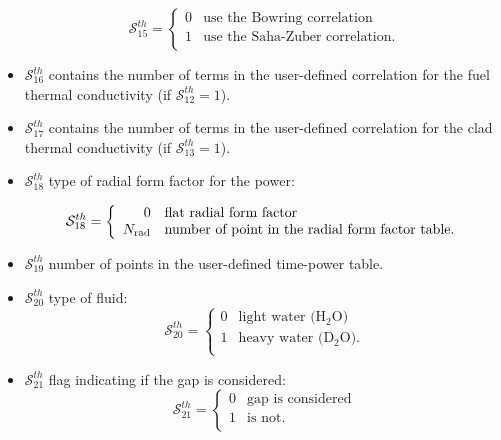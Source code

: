 \begin{itemize}
\begin{displaymath} \mathcal{S}^{th}_{15} = \left\{
\begin{array}{rl}
 0 & \textrm{use the Bowring correlation} \\
 1 & \textrm{use the Saha-Zuber correlation.} \\
\end{array} \right.
\end{displaymath}

\item $\mathcal{S}^{th}_{16}$ contains the number of terms in the user-defined correlation for the fuel thermal conductivity (if $\mathcal{S}^{th}_{12}=1$).
\item $\mathcal{S}^{th}_{17}$ contains the number of terms in the user-defined correlation for the clad thermal conductivity (if $\mathcal{S}^{th}_{13}=1$).
\item $\mathcal{S}^{th}_{18}$ type of radial form factor for the power:

\begin{displaymath} \mathcal{S}^{th}_{18} = \left\{
\begin{array}{rl}
 0 & \textrm{flat radial form factor} \\
 N_{\rm rad} & \textrm{number of point in the radial form factor table.} \\
\end{array} \right.
\end{displaymath}

\item $\mathcal{S}^{th}_{19}$ number of points in the user-defined time-power table.

\item $\mathcal{S}^{th}_{20}$ type of fluid:
\begin{displaymath} \mathcal{S}^{th}_{20} = \left\{
\begin{array}{rl}
 0 & \textrm{light water (H$_2$O)} \\
 1 & \textrm{heavy water (D$_2$O).} \\
\end{array} \right.
\end{displaymath}

\item $\mathcal{S}^{th}_{21}$ flag indicating if the gap is considered:
\begin{displaymath} \mathcal{S}^{th}_{21} = \left\{
\begin{array}{rl}
 0 & \textrm{gap is considered} \\
 1 & \textrm{is not.} \\
\end{array} \right.
\end{displaymath}

\end{itemize}

